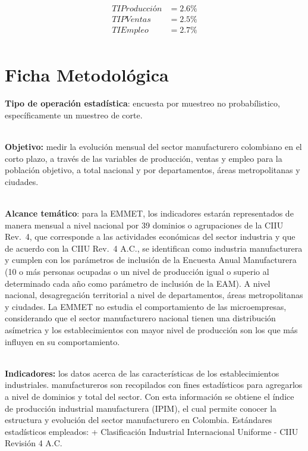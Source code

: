 \documentclass[
]{article}
\begin{document}
\begin{align*}
TIProducción &= 2.6 \%\\
TIPVentas &= 2.5 \%\\
TIEmpleo &= 2.7\%\\
\end{align*}

\hypertarget{ficha-metodoluxf3gica}{%
\section{Ficha Metodológica}\label{ficha-metodoluxf3gica}}

\textbf{Tipo de operación estadística}: encuesta por muestreo no
probabílistico, específicamente un muestreo de corte.\\
\strut \\
\textbf{Objetivo:} medir la evolución mensual del sector manufacturero
colombiano en el corto plazo, a través de las variables de producción,
ventas y empleo para la población objetivo, a total nacional y por
departamentos, áreas metropolitanas y ciudades.\\
\strut \\
\textbf{Alcance temático}: para la EMMET, los indicadores estarán
representados de manera mensual a nivel nacional por 39 dominios o
agrupaciones de la CIIU Rev.~4, que corresponde a las actividades
económicas del sector industria y que de acuerdo con la CIIU Rev.~4
A.C., se identifican como industria manufacturera y cumplen con los
parámetros de inclusión de la Encuesta Anual Manufacturera (10 o más
personas ocupadas o un nivel de producción igual o superio al
determinado cada año como parámetro de inclusión de la EAM). A nivel
nacional, desagregación territorial a nivel de departamentos, áreas
metropolitanas y ciudades. La EMMET no estudia el comportamiento de las
microempresas, considerando que el sector manufacturero nacional tienen
una distribución asímetrica y los establecimientos con mayor nivel de
producción son los que más influyen en su comportamiento.\\
\strut \\
\textbf{Indicadores:} los datos acerca de las características de los
establecimientos industriales. manufactureros son recopilados con fines
estadísticos para agregarlos a nivel de dominios y total del sector. Con
esta información se obtiene el índice de producción industrial
manufacturera (IPIM), el cual permite conocer la estructura y evolución
del sector manufacturero en Colombia. Estándares estadísticos empleados:
+ Clasificación Industrial Internacional Uniforme - CIIU Revisión 4 A.C.
\end{document}
